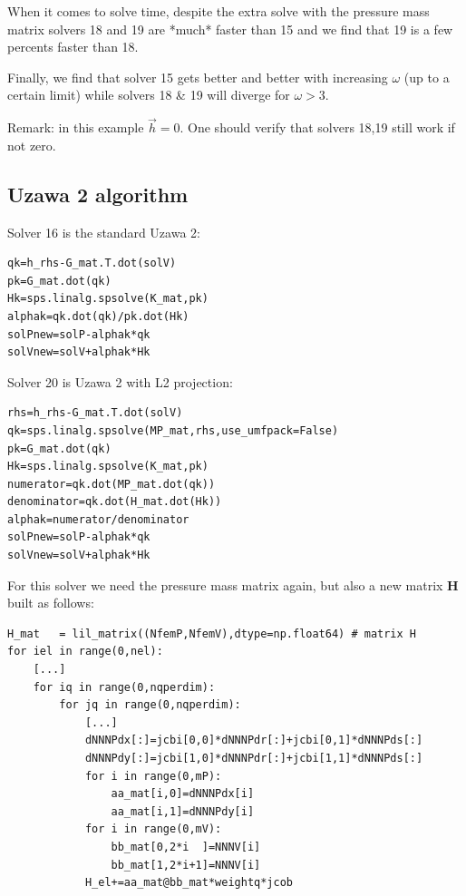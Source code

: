 When it comes to solve time, despite the extra solve with the 
pressure mass matrix solvers 18 and 19 are *much* faster than 15
and we find that 19 is a few percents faster than 18. 

Finally, we find that solver 15 gets better and better with increasing $\omega$
(up to a certain limit) while solvers 18 \& 19 will diverge for $\omega>3$.

Remark: in this example $\vec{h}=0$. One should verify that solvers 18,19 still work if not zero.

\subsection*{Uzawa 2 algorithm}

Solver 16 is the standard Uzawa 2:
\begin{lstlisting}
qk=h_rhs-G_mat.T.dot(solV)      
pk=G_mat.dot(qk)               
Hk=sps.linalg.spsolve(K_mat,pk) 
alphak=qk.dot(qk)/pk.dot(Hk)   
solPnew=solP-alphak*qk        
solVnew=solV+alphak*Hk       
\end{lstlisting}


Solver 20 is Uzawa 2 with L2 projection: 
\begin{lstlisting}
rhs=h_rhs-G_mat.T.dot(solV)
qk=sps.linalg.spsolve(MP_mat,rhs,use_umfpack=False)    
pk=G_mat.dot(qk)                           
Hk=sps.linalg.spsolve(K_mat,pk)             
numerator=qk.dot(MP_mat.dot(qk))             
denominator=qk.dot(H_mat.dot(Hk))             
alphak=numerator/denominator                   
solPnew=solP-alphak*qk                          
solVnew=solV+alphak*Hk                           
\end{lstlisting}

For this solver we need the pressure mass matrix again, but also a new
matrix ${\bm H}$ built as follows:
\begin{lstlisting}
H_mat   = lil_matrix((NfemP,NfemV),dtype=np.float64) # matrix H 
for iel in range(0,nel):
    [...]
    for iq in range(0,nqperdim):
        for jq in range(0,nqperdim):
            [...]
            dNNNPdx[:]=jcbi[0,0]*dNNNPdr[:]+jcbi[0,1]*dNNNPds[:]
            dNNNPdy[:]=jcbi[1,0]*dNNNPdr[:]+jcbi[1,1]*dNNNPds[:]
            for i in range(0,mP):
                aa_mat[i,0]=dNNNPdx[i]
                aa_mat[i,1]=dNNNPdy[i]
            for i in range(0,mV):
                bb_mat[0,2*i  ]=NNNV[i] 
                bb_mat[1,2*i+1]=NNNV[i] 
            H_el+=aa_mat@bb_mat*weightq*jcob
\end{lstlisting}

